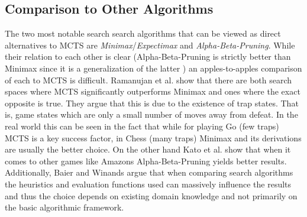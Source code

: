 \subsection{Comparison to Other Algorithms}
The two most notable search search algorithms that can be viewed as direct alternatives to MCTS are \textit{Minimax}/\textit{Expectimax} and \textit{Alpha-Beta-Pruning}. While their relation to each other is clear (Alpha-Beta-Pruning is strictly better than Minimax since it is a generalization of the latter \cite{knuth1975analysis}) an apples-to-apples comparison of each to MCTS is difficult. Ramanujan et al. \cite{ramanujan2011behavior} show that there are both search spaces where MCTS significantly outperforms Minimax and ones where the exact opposite is true. They argue that this is due to the existence of trap states. That is, game states which are only a small number of moves away from defeat. In the real world this can be seen in the fact that while for playing Go (few traps) MCTS is a key success factor, in Chess (many traps) Minimax and its derivations are usually the better choice. On the other hand Kato et al. \cite{kato2015comparative} show that when it comes to other games like Amazons Alpha-Beta-Pruning yields better results. Additionally, Baier and Winands \cite{baier2014monte} argue that when comparing search algorithms the heuristics and evaluation functions used can massively influence the results and thus the choice depends on existing domain knowledge and not primarily on the basic algorithmic framework.
\FloatBarrier